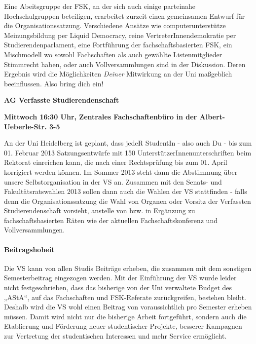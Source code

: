 Eine Abeitsgruppe der FSK, an der sich auch einige parteinahe Hochschulgruppen beteiligen, erarbeitet zurzeit einen gemeinsamen Entwurf für die Organisationssatzung. Verschiedene Ansätze wie computerunterstütze Meinungsbildung per Liquid Democracy, reine VertreterInnendemokratie per Studierendenparlament, eine Fortführung der fachschaftsbasierten \gls{FSK}, ein Mischmodell wo sowohl Fachschaften als auch gewählte Listenmitglieder Stimmrecht haben, oder auch Vollversammlungen sind in der Diskussion. Deren Ergebnis wird die Möglichkeiten \emph{Deiner} Mitwirkung an der Uni maßgeblich beeinflussen. Also bring dich ein!

\begin{center}
\large
\textbf{AG Verfasste Studierendenschaft}

\textbf{Mittwoch 16:30 Uhr, Zentrales Fachschaftenbüro in der Albert-Ueberle-Str. 3-5}
\end{center}

An der Uni Heidelberg ist geplant, dass jedeR StudentIn - also auch Du - bis zum 01. Februar 2013 Satzungsentwürfe mit 150 UnterstützerInnenunterschriften beim Rektorat einreichen kann, die nach einer Rechtsprüfung bis zum 01. April korrigiert werden können. Im Sommer 2013 steht dann die Abstimmung über unsere Selbstorganisation in der VS an. Zusammen mit den Senats- und Fakultätsratswahlen 2013 sollen dann auch die Wahlen der VS stattfinden - falls denn die Organisationssatzung die Wahl von Organen oder Vorsitz der Verfassten Studierendenschaft vorsieht, anstelle von bzw. in Ergänzung zu fachschaftsbasierten Räten wie der aktuellen Fachschaftskonferenz und Vollversammlungen.

\paragraph{Beitragshoheit}

Die VS kann von allen Studis Beiträge erheben, die zusammen mit dem sonstigen Semesterbeitrag eingezogen werden. Mit der Einführung der VS wurde leider nicht festgeschrieben, dass das bisherige von der Uni verwaltete Budget des „AStA“, auf das Fachschaften und FSK-Referate zurückgreifen, bestehen bleibt. Deshalb wird die VS wohl einen Beitrag von voraussichtlich  pro Semester erheben müssen. Damit wird nicht nur die bisherige Arbeit fortgeführt, sondern auch die Etablierung und Förderung neuer studentischer Projekte, besserer Kampagnen zur Vertretung der studentischen Interessen und mehr Service ermöglicht.

